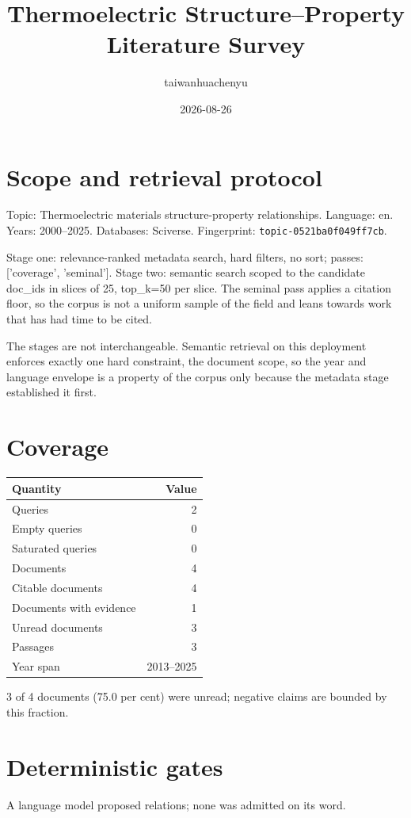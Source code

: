 \documentclass[11pt,a4paper]{article}
\title{Thermoelectric Structure--Property Literature Survey}
\author{taiwanhuachenyu}
\date{2026-08-26}
\begin{document}
\maketitle
\tableofcontents

\section{Scope and retrieval protocol}
Topic: Thermoelectric materials structure-property relationships. Language: en. Years: 2000--2025. Databases: Sciverse. Fingerprint: \texttt{topic-0521ba0f049ff7cb}.

Stage one: relevance-ranked metadata search, hard filters, no sort; passes: ['coverage', 'seminal']. Stage two: semantic search scoped to the candidate doc\_ids in slices of 25, top\_k=50 per slice. The seminal pass applies a citation floor, so the corpus is not a uniform sample of the field and leans towards work that has had time to be cited.

The stages are not interchangeable. Semantic retrieval on this deployment enforces exactly one hard constraint, the document scope, so the year and language envelope is a property of the corpus only because the metadata stage established it first.

\section{Coverage}
\begin{tabular}{lr}
\toprule
Quantity & Value \\
\midrule
Queries & 2 \\
Empty queries & 0 \\
Saturated queries & 0 \\
Documents & 4 \\
Citable documents & 4 \\
Documents with evidence & 1 \\
Unread documents & 3 \\
Passages & 3 \\
Year span & 2013--2025 \\
\bottomrule
\end{tabular}

3 of 4 documents (75.0 per cent) were unread; negative claims are bounded by this fraction.


\section{Deterministic gates}
A language model proposed relations; none was admitted on its word.
\end{document}
